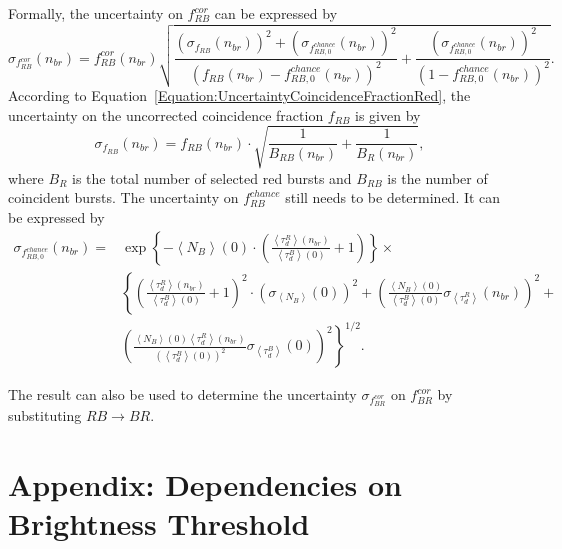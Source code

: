 Formally, the uncertainty on $f_{RB}^{cor}$ can be expressed by
\begin{equation}
\sigma_{f_{RB}^{cor}}(n_{br}) = f_{RB}^{cor}(n_{br}) \sqrt{\frac{\left(\sigma_{f_{RB}}(n_{br})\right)^2 + \left(\sigma_{f_{RB, 0}^{chance}}(n_{br})\right)^2}{\left(f_{RB}(n_{br}) - f_{RB, 0}^{chance}(n_{br})\right)^2} + \frac{\left(\sigma_{f_{RB, 0}^{chance}}(n_{br})\right)^2}{\left(1 - f_{RB, 0}^{chance}(n_{br})\right)^2}}.
\end{equation}
According to Equation~\eqref{Equation:UncertaintyCoincidenceFractionRed}, the uncertainty on the uncorrected coincidence fraction $f_{RB}$ is given by
\begin{equation*}
\sigma_{f_{RB}}(n_{br}) = f_{RB}(n_{br}) \cdot \sqrt{\frac{1}{B_{RB}(n_{br})} + \frac{1}{B_{R}(n_{br})}},
\end{equation*}
where $B_{R}$ is the total number of selected red bursts and $B_{RB}$ is the number of coincident bursts. The uncertainty on $f_{RB}^{chance}$ still needs to be determined. It can be expressed by
\begin{equation}
\begin{aligned}
\sigma_{f_{RB, 0}^{chance}}(n_{br}) = & \exp\left\{-\left\langle N_B \right\rangle (0) \cdot \left(\frac{\left\langle \tau_d^R \right\rangle (n_{br})}{\left\langle \tau_d^B \right\rangle (0)} + 1\right)\right\} \times \\  
& \left\{ \left(\frac{\left\langle \tau_d^R \right\rangle (n_{br})}{\left\langle \tau_d^B \right\rangle (0)} + 1\right)^2 \cdot \left(\sigma_{\left\langle N_B \right\rangle}(0)\right)^2 + \left(\frac{\left\langle N_B \right\rangle(0)}{\left\langle \tau_d^B \right\rangle (0)} \sigma_{\left\langle \tau_d^R \right\rangle}(n_{br})\right)^2 + \right.\\
& \left. \left( \frac{\left\langle N_B \right\rangle(0)\left\langle \tau_d^R \right\rangle (n_{br})}{\left(\left\langle \tau_d^B \right\rangle (0)\right)^2} \sigma_{\left\langle \tau_d^B \right\rangle}(0)\right)^2\right\}^{1/2}.
\end{aligned}
\end{equation}

The result can also be used to determine the uncertainty $\sigma_{f_{BR}^{cor}}$ on $f_{BR}^{cor}$ by substituting ${RB \rightarrow BR}$.

\chapter{Appendix: Dependencies on Brightness Threshold} 

